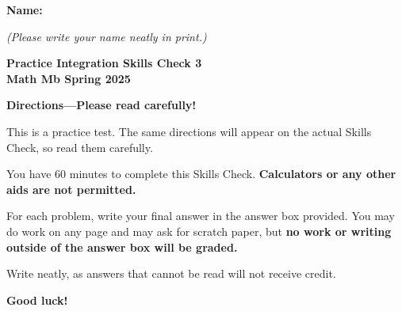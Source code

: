 \documentclass{article}
\begin{document}
 

 \noindent
{\large \mbox{} \hfill \bf Name:\underline{\hspace{2.8in}}}

 {\mbox{} \hfill \it (Please write your name neatly in print.)}


 
\medskip
 
\noindent
{\large\bf
Practice Integration Skills Check 3 \\ Math Mb Spring 2025}
\noindent

{\Large
\begin{center}\textbf{Directions---Please read carefully!} \end{center}}

This is a practice test. The same directions will appear on the actual Skills Check, so read them carefully.

\hrulefill 

You have 60 minutes to complete this Skills Check. \textbf{Calculators or any other aids are not permitted.}  


For each problem, write your final answer in the answer box provided. You may do work on any page and may ask for scratch paper, but \textbf{no work or writing outside of the answer box will be graded.}

Write neatly, as answers that cannot be read will not receive credit. 

   

\begin{center}\textbf{Good luck!}\end{center}
\end{document}
